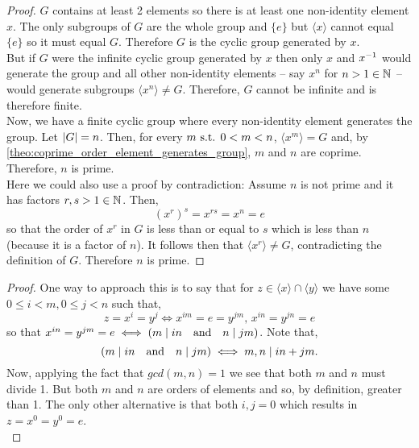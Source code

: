 \documentclass[MathsNotesBase.tex]{subfiles}
\begin{document}
{	
	\begin{proof}
		$G$ contains at least 2 elements so there is at least one non-identity element $x$. The only subgroups of $G$ are the whole group and ${ \{e\} }$ but ${ \langle x \rangle  }$ cannot equal ${ \{e\} }$ so it must equal $G$. Therefore $G$ is the cyclic group generated by $x$.\\
		But if $G$ were the infinite cyclic group generated by $x$ then only $x$ and ${x}^{-1}$ would generate the group and all other non-identity elements -- say $x^n$ for ${ n > 1 \in \mathbb{N}^{} }$ -- would generate subgroups ${ \langle x^n \rangle \neq G }$. Therefore, $G$ cannot be infinite and is therefore finite.\\
		Now, we have a finite cyclic group where every non-identity element generates the group. Let ${ \left\lvert G\right\rvert = n }$. Then, for every ${ m \text{ s.t. } 0 < m < n }$, ${ \langle x^m \rangle = G }$ and, by \autoref{theo:coprime_order_element_generates_group}, $m$ and $n$ are coprime. Therefore, $n$ is prime.\\
		Here we could also use a proof by contradiction: Assume $n$ is not prime and it has factors ${ r,s > 1 \in \mathbb{N}^{} }$. Then,
		\[ (x^r)^s = x^{rs} = x^n = e \]
		so that the order of $x^r$ in $G$ is less than or equal to $s$ which is less than $n$ (because it is a factor of $n$). It follows then that ${ \langle x^r \rangle \neq G }$, contradicting the definition of $G$. Therefore $n$ is prime.
	\end{proof}

	\bigskip
	\begin{proof}
		One way to approach this is to say that for ${ z \in \langle x \rangle \cap \langle y \rangle }$ we have some ${ 0 \leq i < m, 0 \leq j < n }$ such that,
		\[ z = x^i = y^j \iff x^{im} = e = y^{jm},\, x^{in} = y^{jn} = e \]
		so that ${ x^{in} = y^{jm} = e \iff (m \mid in \hspace{10pt}\text{and}\hspace{10pt} n \mid jm) }$. Note that,
		\[ (m \mid in \hspace{10pt}\text{and}\hspace{10pt} n \mid jm) \iff m,n \mid in + jm. \]
		Now, applying the fact that ${ gcd(m,n) = 1 }$ we see that both $m$ and $n$ must divide 1. But both $m$ and $n$ are orders of elements and so, by definition, greater than 1. The only other alternative is that both ${ i,j = 0 }$ which results in ${ z = x^0 = y^0 = e }$.\\
		

\end{proof}}
\end{document}
